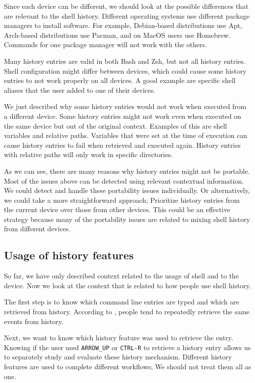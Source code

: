 Since each device can be different, we should look at the possible differences that are relevant to the shell history. Different operating systems use different package managers to install software. For example, Debian-based distributions use Apt, Arch-based distributions use Pacman, and on MacOS users use Homebrew. Commands for one package manager will not work with the others.

Many history entries are valid in both Bash and Zsh, but not all history entries. Shell configuration might differ between devices, which could cause some history entries to not work properly on all devices. A good example are specific shell aliases that the user added to one of their devices.

We just described why some history entries would not work when executed from a different device. Some history entries might not work even when executed on the same device but out of the original context. Examples of this are shell variables and relative paths. Variables that were set at the time of execution can cause history entries to fail when retrieved and executed again. History entries with relative paths will only work in specific directories.

As we can see, there are many reasons why history entries might not be portable. Most of the issues above can be detected using relevant contextual information. 
We could detect and handle these portability issues individually. Or alternatively, we could take a more straightforward approach; Prioritize history entries from the current device over those from other devices. This could be an effective strategy because many of the portability issues are related to mixing shell history from different devices. 

\subsection{Usage of history features}

So far, we have only described context related to the usage of shell and to the device. Now we look at the context that is related to how people use shell history. 

The first step is to know which command line entries are typed and which are retrieved from history. 
According to \cite{greenberg1993computer}, people tend to repeatedly retrieve the same events from history.

Next, we want to know which history feature was used to retrieve the entry. Knowing if the user used \verb|ARROW_UP| or \verb|CTRL-R| to retrieve a history entry allows us to separately study and evaluate these history mechanism. Different history features are used to complete different workflows; We should not treat them all as one.

